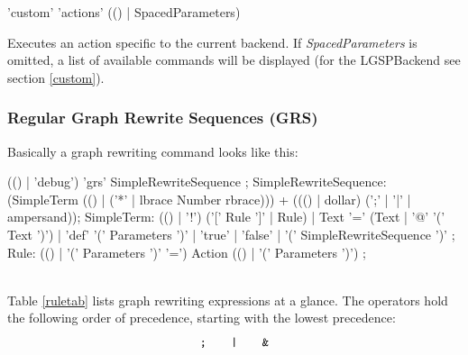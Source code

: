 \begin{rail}
  'custom' 'actions' (() | SpacedParameters)
\end{rail}
Executes an action specific to the current backend. If \emph{SpacedParameters} is omitted, a list of available commands will be displayed (for the LGSPBackend see section \ref{custom}).

\subsubsection{Regular Graph Rewrite Sequences (GRS)}
Basically a graph rewriting command looks like this:
\makeatletter
\begin{rail}
  (() | 'debug') 'grs' SimpleRewriteSequence ;
  SimpleRewriteSequence: (SimpleTerm (() | ('*' | lbrace Number rbrace))) + ((() | dollar) (';' | '|' | ampersand));
  SimpleTerm: (() | '!') ('[' Rule ']' | Rule) |
    Text '=' (Text | '@' '(' Text ')') |
    'def' '(' Parameters ')' |
    'true' |
    'false' |
    '(' SimpleRewriteSequence ')' ;
  Rule: (() | '(' Parameters ')' '=') Action (() | '(' Parameters ')') ;
\end{rail}
\makeatother
\mbox{\quad}\\
Table \ref{ruletab} lists graph rewriting expressions at a glance. The operators hold the following order of precedence, starting with the lowest precedence: 
\[ \text{\texttt{;}} \;\;\;\;\;\;\; \text{\texttt{|}} \;\;\;\;\;\;\;  \text{\texttt{\&}}\] 
\makeatletter
